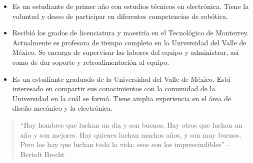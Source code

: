 \documentclass[10pt,a4paper,normalphoto]{altacv}
\begin{document}
\begin{fullwidth}
\divider

\begin{itemize}
\vspace{-0.6cm}
\item Es un estudiante de primer año con estudios técnicos en electrónica. Tiene la voluntad y deseo de participar en diferentes competencias de robótica.
\end{itemize}

\begin{comment}
\divider

\cvevent{Mariana Zul Rivera (870095461)}{Miembro del equipo}
\begin{itemize}
\vspace{-0.6cm}
\item Es una estudiante de primer año que se ha involucrado en la robótica desde 2012. Junto a su equipo ganó el premio a mejor diesño mecánico en el torneo internacional de RoboCup de Leipzig, Alemania 2016 (\href{http://www.excelsior.com.mx/nacional/2016/07/14/1104968} {dar clic para ver noticia}). Actualmente trabaja como maestra de robótica para niños.
\end{itemize}

\end{comment}



\begin{itemize}
\vspace{-0.6cm}
\item Recibió los grados de licenciatura y maestría en el Tecnológico de Monterrey. Actualmente es profesora de tiempo completo en la Universidad del Valle de México. Se encarga de supervisar las labores del equipo y administrar, así como de dar soporte y retroalimentación al equipo.
\end{itemize}

\divider

\begin{itemize}
\vspace{-0.6cm}
\item Es un estudiante graduado de la Universidad del Valle de México. Está interesado en compartir sus conocimientos con la comunidad de la Universidad en la cuál se formó. Tiene amplia experiencia en el área de diseño mecánico y la electrónica.
\end{itemize}



\begin{quote}
``Hay hombres que luchan un día y son buenos. Hay otros que luchan un año y son mejores. Hay quienes luchan muchos años, y son muy buenos. Pero los hay que luchan toda la vida: esos son los imprescindibles'' -- Bertolt Brecht
\end{quote}

\end{fullwidth}
\end{document}
